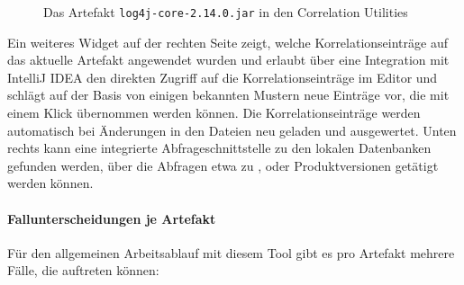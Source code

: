 \begin{figure}
    \centering
    \caption{Das Artefakt \texttt{log4j-core-2.14.0.jar} in den Correlation Utilities}
    \label{fig:correlation-utilities-demo}
\end{figure}

Ein weiteres Widget auf der rechten Seite zeigt, welche Korrelationseinträge auf das aktuelle Artefakt angewendet wurden und erlaubt über eine Integration mit IntelliJ IDEA den direkten Zugriff auf die Korrelationseinträge im Editor und schlägt auf der Basis von einigen bekannten Mustern neue Einträge vor, die mit einem Klick übernommen werden können.
Die Korrelationseinträge werden automatisch bei Änderungen in den Dateien neu geladen und ausgewertet.
Unten rechts kann eine integrierte Abfrageschnittstelle zu den lokalen Datenbanken gefunden werden, über die Abfragen etwa zu ,  oder Produktversionen getätigt werden können.


\paragraph{Fallunterscheidungen je Artefakt}
Für den allgemeinen Arbeitsablauf mit diesem Tool gibt es pro Artefakt mehrere Fälle, die auftreten können:

